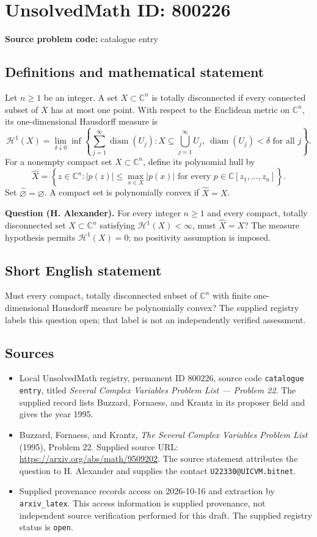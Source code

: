 \documentclass[11pt]{article}
\newcommand{\C}{\mathbb{C}}
\begin{document}
\section*{UnsolvedMath ID: 800226}
\textbf{Source problem code:} catalogue entry
\subsection{Definitions and mathematical statement}
Let \(n\geq 1\) be an integer. A set \(X\subset\C^n\) is totally disconnected if every connected subset of \(X\) has at most one point. With respect to the Euclidean metric on \(\C^n\), its one-dimensional Hausdorff measure is
\[
\mathcal H^1(X)=\lim_{\delta\downarrow0}\inf\left\{\sum_{j=1}^{\infty}\operatorname{diam}(U_j): X\subseteq\bigcup_{j=1}^{\infty}U_j,\ \operatorname{diam}(U_j)<\delta\text{ for all }j\right\}.
\]
For a nonempty compact set \(X\subset\C^n\), define its polynomial hull by
\[
\widehat X=\left\{z\in\C^n: |p(z)|\leq\max_{x\in X}|p(x)|\text{ for every }p\in\C[z_1,\ldots,z_n]\right\}.
\]
Set \(\widehat\varnothing=\varnothing\). A compact set is polynomially convex if \(\widehat X=X\).

\textbf{Question (H. Alexander).} For every integer \(n\geq1\) and every compact, totally disconnected set \(X\subset\C^n\) satisfying \(\mathcal H^1(X)<\infty\), must \(\widehat X=X\)? The measure hypothesis permits \(\mathcal H^1(X)=0\); no positivity assumption is imposed.
\subsection{Short English statement}
Must every compact, totally disconnected subset of \(\C^n\) with finite one-dimensional Hausdorff measure be polynomially convex? The supplied registry labels this question open; that label is not an independently verified assessment.
\subsection{Sources}
\begin{itemize}
\item Local UnsolvedMath registry, permanent ID \(800226\), source code \texttt{catalogue entry}, titled \emph{Several Complex Variables Problem List --- Problem 22}. The supplied record lists Buzzard, Fornaess, and Krantz in its proposer field and gives the year 1995.
\item Buzzard, Fornaess, and Krantz, \emph{The Several Complex Variables Problem List} (1995), Problem 22. Supplied source URL: \url{https://arxiv.org/abs/math/9509202}. The source statement attributes the question to H. Alexander and supplies the contact \texttt{U22330@UICVM.bitnet}.
\item Supplied provenance records access on 2026-10-16 and extraction by \texttt{arxiv\_latex}. This access information is supplied provenance, not independent source verification performed for this draft. The supplied registry status is \texttt{open}.
\end{itemize}
\end{document}
